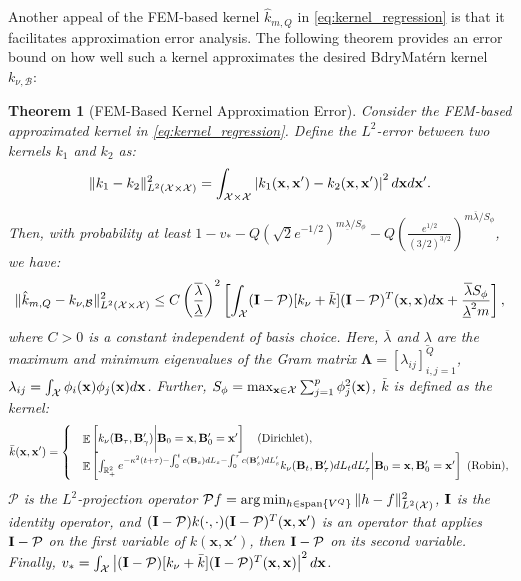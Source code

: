 \documentclass[aos,preprint]{imsart}
\theoremstyle{plain}
\newtheorem{theorem}{Theorem}[section]
\DeclareMathOperator{\E}{\mathbb E}
\newcommand{\Real}{\mathbb R}
\newcommand{\CalX}{\mathcal X}
\newcommand{\CalP}{\mathcal P}
\newcommand{\Bx}{\bold x}
\newcommand{\BFx}{\bold x}
\newcommand{\BB}{\bold B}
\theoremstyle{remark}
\begin{document}
Another appeal of the FEM-based kernel $\hat{k}_{m,Q}$ in \eqref{eq:kernel_regression} is that it facilitates approximation error analysis. The following theorem provides an error bound on how well such a kernel approximates the desired BdryMat\'ern kernel $k_{\nu,\mathcal{B}}$:
\begin{theorem}[FEM-Based Kernel Approximation Error]
    Consider the FEM-based approximated kernel in \eqref{eq:kernel_regression}. Define the \(L^2\)-error between two kernels \(k_1\) and \(k_2\) as:
\begin{equation}
     \|k_1 - k_2\|^2_{L^2(\CalX \times \CalX)} = {\int_{\CalX \times \CalX} \left|k_1(\BFx, \BFx') - k_2(\BFx, \BFx')\right|^2 d\BFx d\BFx'}. \label{eq:HS_norm}
\end{equation}
Then, with probability at least \(1 - v_* - Q(\sqrt{2}e^{-1/2})^{m\underline{\lambda}/S_\phi} - Q\left(\frac{e^{1/2}}{(3/2)^{3/2}}\right)^{m\overline{\lambda}/S_\phi}\), we have:
\begin{equation}
    \label{eq:convergence_general}
    \|\hat{k}_{m,Q} - k_{\nu,\mathcal{B}}\|_{L^2(\CalX \times \CalX)}^2 \leq C \left(\frac{\overline{\lambda}}{\underline{\lambda}}\right)^2 \left[\int_\CalX (\bold{I} - \CalP)[k_\nu + \bar{k}](\bold{I} - \CalP)^T(\Bx, \Bx) d\Bx + \frac{\overline{\lambda}S_\phi}{\underline{\lambda}^2m}\right],
\end{equation}
where $C>0$ is a constant independent of basis choice. Here, $\overline{\lambda}$ and $\underline{\lambda}$ are the maximum and minimum eigenvalues of the Gram matrix $\boldsymbol{\Lambda} = [\lambda_{ij}]_{i,j=1}^Q$, $\lambda_{ij} = \int_\CalX \phi_i(\BFx) \phi_j(\BFx) d\BFx$. Further, \(S_\phi = \max_{\Bx \in \CalX} \sum_{j=1}^p \phi_j^2(\Bx)\), $\bar{k}$ is defined as the kernel:
\small
\begin{equation}
    \bar{k}(\mathbf{x},\mathbf{x}')=
    \begin{cases}
        &\E\left[k_\nu(\BB_\tau,\BB'_\gamma)\bigg|\BB_0=\mathbf{x},\BB'_0=\mathbf{x}'\right]\quad\textup{(Dirichlet)},\\
        &\E\left[\int_{\Real_+^2}e^{-\kappa^2(t+\tau)-\int_0^tc(\BB_s)dL_s-\int_0^\tau c(\BB'_s)dL'_s}k_\nu(\BB_t,\BB'_\tau)dL_tdL'_\tau\bigg|\BB_0=\mathbf{x},\BB'_0=\mathbf{x}'\right]\  \textup{(Robin)},
    \end{cases}
    \label{eq:kbar}
\end{equation}
\normalsize
$\mathcal{P}$ is the $L^2$-projection operator $\CalP f = \arg\min_{h \in \textup{span}\{V^Q\}} \|h - f\|_{L^2(\CalX)}^2$, $\bold{I}$ is the identity operator, and $(\bold{I} - \CalP)k(\cdot, \cdot)(\bold{I} - \CalP)^T(\BFx, \BFx')$ is an operator that applies $\bold{I} - \CalP$ on the first variable of $k(\mathbf{x},\mathbf{x}')$, then $\bold{I} - \CalP$ on its second variable. Finally, $v_* = \int_\CalX \left|(\bold{I} - \CalP)[k_\nu + \bar{k}](\bold{I} - \CalP)^T(\Bx, \Bx)\right|^2 d\Bx$.
    \label{thm:convergence_general}

\end{theorem}
\end{document}
